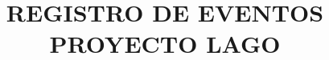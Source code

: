 \documentclass[letter,oneside,12pt,spanish]{report}  %
\begin{document}
\title{REGISTRO DE EVENTOS PROYECTO LAGO}
\tableofcontents                                      %
\listoffigures                         %
\listoftables
\newpage


\end{document}
